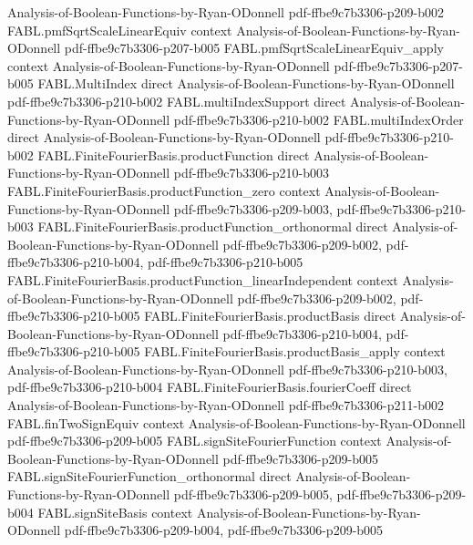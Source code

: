\begin{theorem}
  {Analysis-of-Boolean-Functions-by-Ryan-ODonnell}
  {pdf-ffbe9c7b3306-p209-b002}
\proofstep
  {FABL.pmfSqrtScaleLinearEquiv}
  {context}
  {Analysis-of-Boolean-Functions-by-Ryan-ODonnell}
  {pdf-ffbe9c7b3306-p207-b005}
\proofstep
  {FABL.pmfSqrtScaleLinearEquiv_apply}
  {context}
  {Analysis-of-Boolean-Functions-by-Ryan-ODonnell}
  {pdf-ffbe9c7b3306-p207-b005}
\proofstep
  {FABL.MultiIndex}
  {direct}
  {Analysis-of-Boolean-Functions-by-Ryan-ODonnell}
  {pdf-ffbe9c7b3306-p210-b002}
\proofstep
  {FABL.multiIndexSupport}
  {direct}
  {Analysis-of-Boolean-Functions-by-Ryan-ODonnell}
  {pdf-ffbe9c7b3306-p210-b002}
\proofstep
  {FABL.multiIndexOrder}
  {direct}
  {Analysis-of-Boolean-Functions-by-Ryan-ODonnell}
  {pdf-ffbe9c7b3306-p210-b002}
\proofstep
  {FABL.FiniteFourierBasis.productFunction}
  {direct}
  {Analysis-of-Boolean-Functions-by-Ryan-ODonnell}
  {pdf-ffbe9c7b3306-p210-b003}
\proofstep
  {FABL.FiniteFourierBasis.productFunction_zero}
  {context}
  {Analysis-of-Boolean-Functions-by-Ryan-ODonnell}
  {pdf-ffbe9c7b3306-p209-b003,
    pdf-ffbe9c7b3306-p210-b003}
\proofstep
  {FABL.FiniteFourierBasis.productFunction_orthonormal}
  {direct}
  {Analysis-of-Boolean-Functions-by-Ryan-ODonnell}
  {pdf-ffbe9c7b3306-p209-b002,
    pdf-ffbe9c7b3306-p210-b004,
    pdf-ffbe9c7b3306-p210-b005}
\proofstep
  {FABL.FiniteFourierBasis.productFunction_linearIndependent}
  {context}
  {Analysis-of-Boolean-Functions-by-Ryan-ODonnell}
  {pdf-ffbe9c7b3306-p209-b002,
    pdf-ffbe9c7b3306-p210-b005}
\proofstep
  {FABL.FiniteFourierBasis.productBasis}
  {direct}
  {Analysis-of-Boolean-Functions-by-Ryan-ODonnell}
  {pdf-ffbe9c7b3306-p210-b004,
    pdf-ffbe9c7b3306-p210-b005}
\proofstep
  {FABL.FiniteFourierBasis.productBasis_apply}
  {context}
  {Analysis-of-Boolean-Functions-by-Ryan-ODonnell}
  {pdf-ffbe9c7b3306-p210-b003,
    pdf-ffbe9c7b3306-p210-b004}
\proofstep
  {FABL.FiniteFourierBasis.fourierCoeff}
  {direct}
  {Analysis-of-Boolean-Functions-by-Ryan-ODonnell}
  {pdf-ffbe9c7b3306-p211-b002}
\proofstep
  {FABL.finTwoSignEquiv}
  {context}
  {Analysis-of-Boolean-Functions-by-Ryan-ODonnell}
  {pdf-ffbe9c7b3306-p209-b005}
\proofstep
  {FABL.signSiteFourierFunction}
  {context}
  {Analysis-of-Boolean-Functions-by-Ryan-ODonnell}
  {pdf-ffbe9c7b3306-p209-b005}
\proofstep
  {FABL.signSiteFourierFunction_orthonormal}
  {direct}
  {Analysis-of-Boolean-Functions-by-Ryan-ODonnell}
  {pdf-ffbe9c7b3306-p209-b005,
    pdf-ffbe9c7b3306-p209-b004}
\proofstep
  {FABL.signSiteBasis}
  {context}
  {Analysis-of-Boolean-Functions-by-Ryan-ODonnell}
  {pdf-ffbe9c7b3306-p209-b004,
    pdf-ffbe9c7b3306-p209-b005}

\end{theorem}
